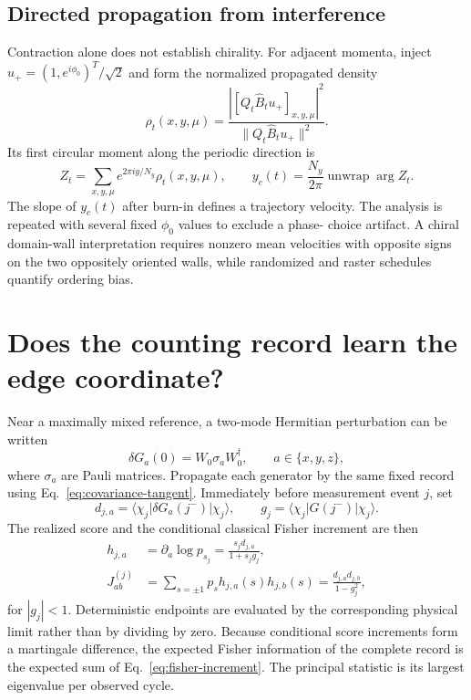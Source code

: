 \documentclass[aps,prb,onecolumn,nofootinbib,superscriptaddress]{revtex4-2}
\newcommand{\ket}[1]{\lvert #1\rangle}
\newcommand{\bra}[1]{\langle #1\rvert}
\begin{document}
\subsection{Directed propagation from interference}

Contraction alone does not establish chirality.  For adjacent momenta, inject
$u_+=(1,e^{i\phi_0})^T/\sqrt2$ and form the normalized propagated density
\begin{equation}
 \rho_t(x,y,\mu)=
 \frac{|[Q_t\widehat B_tu_+]_{x,y,\mu}|^2}
 {\|Q_t\widehat B_tu_+\|^2}.
 \label{eq:interference-density}
\end{equation}
Its first circular moment along the periodic direction is
\begin{equation}
 Z_t=\sum_{x,y,\mu}e^{2\pi i y/N_y}\rho_t(x,y,\mu),
 \qquad
 y_c(t)=\frac{N_y}{2\pi}\operatorname{unwrap}\arg Z_t .
 \label{eq:circular-center}
\end{equation}
The slope of $y_c(t)$ after burn-in defines a trajectory velocity.  The
analysis is repeated with several fixed $\phi_0$ values to exclude a phase-
choice artifact.  A chiral domain-wall interpretation requires nonzero mean
velocities with opposite signs on the two oppositely oriented walls, while
randomized and raster schedules quantify ordering bias.

\section{Does the counting record learn the edge coordinate?}
\label{sec:fisher}

Near a maximally mixed reference, a two-mode Hermitian perturbation can be
written
\begin{equation}
 \delta G_a(0)=W_0\sigma_aW_0^\dagger,
 \qquad a\in\{x,y,z\},
 \label{eq:logical-generators}
\end{equation}
where $\sigma_a$ are Pauli matrices.  Propagate each generator by the same
fixed record using Eq.~\eqref{eq:covariance-tangent}.  Immediately before
measurement event $j$, set
\begin{equation}
 d_{j,a}=\bra{\chi_j}\delta G_a(j^-)\ket{\chi_j},
 \qquad g_j=\bra{\chi_j}G(j^-)\ket{\chi_j}.
 \label{eq:score-data}
\end{equation}
The realized score and the conditional classical Fisher increment are then
\begin{align}
 h_{j,a}
 &=\partial_a\log p_{s_j}
 =\frac{s_jd_{j,a}}{1+s_jg_j},
 \label{eq:realized-score}\\
 J^{(j)}_{ab}
 &=\sum_{s=\pm1}p_s h_{j,a}(s)h_{j,b}(s)
 =\frac{d_{j,a}d_{j,b}}{1-g_j^2},
 \label{eq:fisher-increment}
\end{align}
for $|g_j|<1$.  Deterministic endpoints are evaluated by the corresponding
physical limit rather than by dividing by zero.  Because conditional score
increments form a martingale difference, the expected Fisher information of
the complete record is the expected sum of Eq.~\eqref{eq:fisher-increment}.
The principal statistic is its largest eigenvalue per observed cycle.
\end{document}

